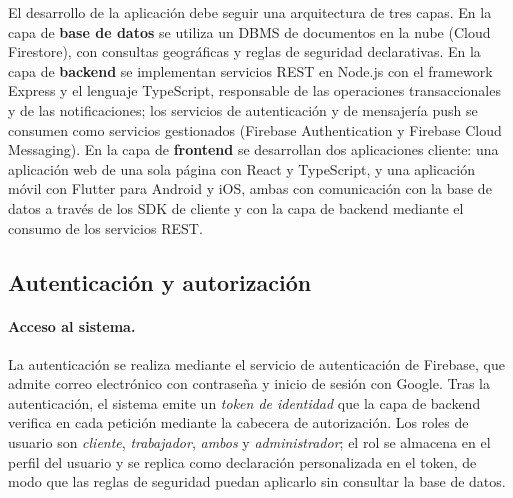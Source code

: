 \documentclass[doc,12pt,a4paper]{apa7}
\begin{document}
El desarrollo de la aplicación debe seguir una arquitectura de tres capas.
En la capa de \textbf{base de datos} se utiliza un DBMS de documentos en la nube
(Cloud Firestore), con consultas geográficas y reglas de seguridad declarativas.
En la capa de \textbf{backend} se implementan servicios REST en Node.js con el
framework Express y el lenguaje TypeScript, responsable de las operaciones
transaccionales y de las notificaciones; los servicios de autenticación y de
mensajería push se consumen como servicios gestionados (Firebase
Authentication y Firebase Cloud Messaging).
En la capa de \textbf{frontend} se desarrollan dos aplicaciones cliente: una
aplicación web de una sola página con React y TypeScript, y una aplicación móvil
con Flutter para Android y iOS, ambas con comunicación con la base de datos a
través de los SDK de cliente y con la capa de backend mediante el consumo de los
servicios REST.

\subsection{Autenticación y autorización}

\paragraph{Acceso al sistema.}
La autenticación se realiza mediante el servicio de autenticación de Firebase,
que admite correo electrónico con contraseña y inicio de sesión con Google.
Tras la autenticación, el sistema emite un \emph{token de identidad} que la capa de backend verifica en cada petición mediante la cabecera de autorización.
Los roles de usuario son \emph{cliente}, \emph{trabajador}, \emph{ambos} y
\emph{administrador}; el rol se almacena en el perfil del usuario y se replica
como declaración personalizada en el token, de modo que las reglas de seguridad
puedan aplicarlo sin consultar la base de datos.
\end{document}

